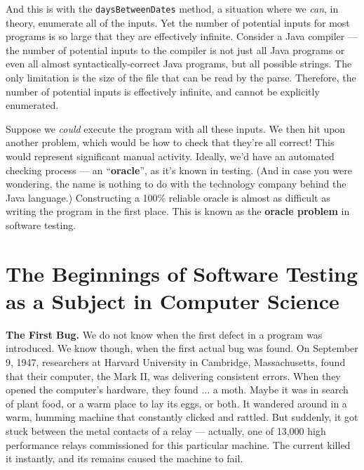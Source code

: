 And this is with the {\tt daysBetweenDates} method, a situation where we {\it
can}, in theory, enumerate all of the inputs. Yet the number of potential inputs
for most programs is so large that they are effectively infinite. Consider a
Java compiler --- the number of potential inputs to the compiler is not just all
Java programs or even all almost syntactically-correct Java programs, but all
possible strings. The only limitation is the size of the file that can be read
by the parse. Therefore, the number of potential inputs is effectively infinite,
and cannot be explicitly enumerated.


Suppose we {\it could} execute the program with all these inputs. We then hit
upon another problem, which would be how to check that they're all correct! This
would represent significant manual activity. Ideally, we'd have an automated
checking process --- an ``{\bf oracle}'', as it's known in testing. (And in case
you were wondering, the name is nothing to do with the technology company behind
the Java language.) Constructing a 100\% reliable oracle is almost as difficult
as writing the program in the first place. This is known as the {\bf oracle
problem} in software testing.



\section{The Beginnings of Software Testing as a Subject in Computer
\mbox{Science}}

{\bf The First Bug.}
%
We do not know when the first defect in a program was introduced. We know
though, when the first actual bug was found. 
%
On September 9, 1947, researchers at Harvard University in Cambridge,
Massachusetts, found that their computer, the Mark II, was delivering consistent
errors. When they opened the computer's hardware, they found ... a moth.
%
Maybe it was in search of plant food, or a warm place to lay its eggs, or both.
It wandered around in a warm, humming machine that constantly clicked and
rattled. But suddenly, it got stuck between the metal contacts of a relay ---
actually, one of 13,000 high performance relays commissioned for this particular
machine. The current killed it instantly, and its remains caused the machine to
fail.

